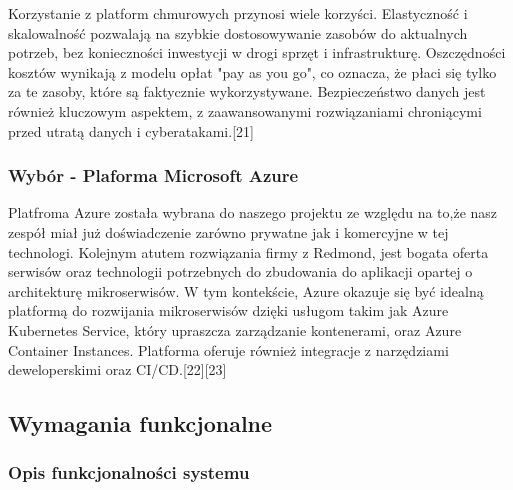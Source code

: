 Korzystanie z platform chmurowych przynosi wiele korzyści. Elastyczność i skalowalność pozwalają na szybkie dostosowywanie zasobów do aktualnych potrzeb, bez konieczności inwestycji w drogi sprzęt i infrastrukturę. Oszczędności kosztów wynikają z modelu opłat "pay as you go", co oznacza, że płaci się tylko za te zasoby, które są faktycznie wykorzystywane. Bezpieczeństwo danych jest również kluczowym aspektem, z zaawansowanymi rozwiązaniami chroniącymi przed utratą danych i cyberatakami.[21]

\subsubsection{Wybór - Plaforma Microsoft Azure}
Platfroma Azure została wybrana do naszego projektu ze względu na to,że nasz zespół miał już doświadczenie zarówno prywatne jak i komercyjne w tej technologi. Kolejnym atutem rozwiązania firmy z Redmond, jest bogata oferta serwisów oraz technologii potrzebnych do zbudowania do aplikacji opartej o architekturę mikroserwisów.
W tym kontekście, Azure okazuje się być idealną platformą do rozwijania mikroserwisów dzięki usługom takim jak Azure Kubernetes Service, który upraszcza zarządzanie kontenerami, oraz Azure Container Instances. Platforma oferuje również integracje z narzędziami deweloperskimi oraz CI/CD.[22][23]

\clearpage

\subsection{Wymagania funkcjonalne}

\subsubsection{Opis funkcjonalności systemu}

